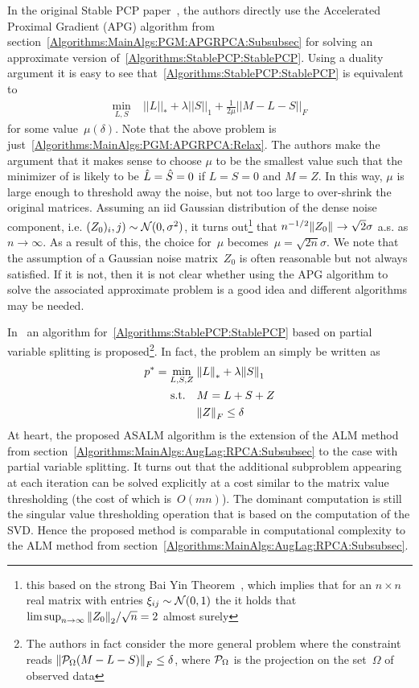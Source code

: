 In the original Stable PCP paper~\cite{Zhou:2010vn}, the authors directly use the Accelerated Proximal Gradient (APG) algorithm from section~\ref{Algorithms:MainAlgs:PGM:APGRPCA:Subsubsec} for solving an approximate version of~\eqref{Algorithms:StablePCP:StablePCP}. Using a duality argument it is easy to see that~\eqref{Algorithms:StablePCP:StablePCP} is equivalent to
\begin{align*}
\min_{L,S} \; &||L||_* + \lambda ||S||_1 + \frac{1}{2\mu} ||M-L-S||_F
\end{align*}
for some value~$\mu(\delta)$. Note that the above problem is just~\eqref{Algorithms:MainAlgs:PGM:APGRPCA:Relax}. The authors make the argument that it makes sense to choose $\mu$ to be the smallest value such that the minimizer of is likely to be ${\hat{L}} = {\hat{S}} = 0$ if $L=S=0$ and $M=Z$. In this way, $\mu$ is large enough to threshold away the noise, but not too large to over-shrink the original matrices. Assuming an iid Gaussian distribution of the dense noise component, i.e. $(Z_0)_i,j) \sim {\mathcal{N}}(0,\sigma^2)$, it turns out\footnote{this based on the strong Bai Yin Theorem~\cite{Bai:1988fk}, which implies that for an $n\times n$ real matrix with entries $\xi_{ij} \sim {\mathcal{N}}(0,1)$ the it holds that $\limsup_{n\rightarrow \infty} {\left\|Z_0\right\|}_{2}^{}/\sqrt{n} = 2$ almost surely} that $n^{-1/2}{\left\|Z_0\right\|}_{}^{} \rightarrow \sqrt{2} \sigma$ a.s. as $n\rightarrow \infty$. As a result of this, the choice for~$\mu$ becomes~$\mu = \sqrt{2n}\sigma$. We note that the assumption of a Gaussian noise matrix~$Z_0$ is often reasonable but not always satisfied. If it is not, then it is not clear whether using the APG algorithm to solve the associated approximate problem is a good idea and different algorithms may be needed. 


In~\cite{Tao:2011vn} an algorithm for~\eqref{Algorithms:StablePCP:StablePCP} based on partial variable splitting is proposed\footnote{The authors in fact consider the more general problem where the constraint reads ${\left\|{\mathcal{P}}_\Omega (M - L - S)\right\|}_{F}^{} \leq \delta$, where ${\mathcal{P}}_\Omega$ is the projection on the set~$\Omega$ of observed data}. In fact, the problem an simply be written as 
%
\begin{align}
\begin{split}
p^* = \min_{L,S,Z} \; &{\left\|L\right\|}_{*}^{} + \lambda {\left\|S\right\|}_{1}^{} \\
\text{s.t.} \quad & M = L +  S + Z \\
&{\left\|Z\right\|}_{F}^{} \leq \delta
\end{split}
\label{Algorithms:StablePCP:PartialVarSplitting}
\end{align}
%
At heart, the proposed ASALM algorithm is the extension of the ALM method from section~\ref{Algorithms:MainAlgs:AugLag:RPCA:Subsubsec} to the case with partial variable splitting. It turns out that the additional subproblem appearing at each iteration can be solved explicitly at a cost similar to the matrix value thresholding (the cost of which is~$O(mn)$). The dominant computation is still the singular value thresholding operation that is based on the computation of the SVD. Hence the proposed method is comparable in computational complexity to the ALM method from section~\ref{Algorithms:MainAlgs:AugLag:RPCA:Subsubsec}.

